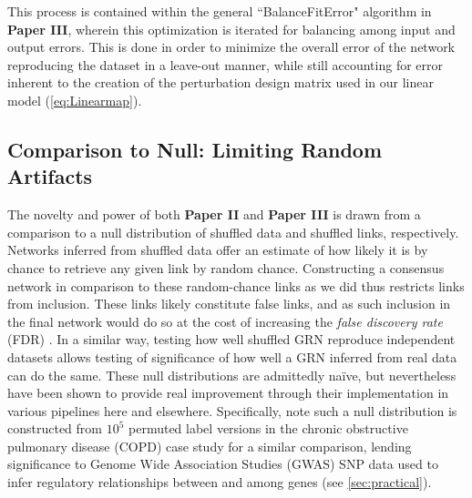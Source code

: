 This process is contained within the general ``BalanceFitError" algorithm in \textbf{Paper III}, wherein this optimization is iterated for balancing among input and output errors. This is done in order to minimize the overall error of the network reproducing the dataset in a leave-out manner, while still accounting for error inherent to the creation of the perturbation design matrix used in our linear model (\cref{eq:Linearmap}).

\subsection{Comparison to Null: Limiting Random Artifacts}
\label{sec:null}
The novelty and power of both \textbf{Paper II} and \textbf{Paper III} is drawn from a comparison to a null distribution of shuffled data and shuffled links, respectively. Networks inferred from shuffled data offer an estimate of how likely it is by chance to retrieve any given link by random chance. Constructing a consensus network in comparison to these random-chance links as we did thus restricts links from inclusion. These links likely constitute false links, and as such inclusion in the final network would do so at the cost of increasing the \emph{false discovery rate} (FDR) \citep{kall2007posterior}. In a similar way, testing how well shuffled GRN reproduce independent datasets allows testing of significance of how well a GRN inferred from real data can do the same. These null distributions are admittedly na{\"i}ve, but nevertheless have been shown to provide real improvement through their implementation in various pipelines here and elsewhere. Specifically, note such a null distribution is constructed from $10^5$ permuted label versions in the chronic obstructive pulmonary disease (COPD) case study \citep{platig2016bipartite} for a similar comparison, lending significance to Genome Wide Association Studies (GWAS) SNP data used to infer regulatory relationships between and among genes (see \cref{sec:practical}).